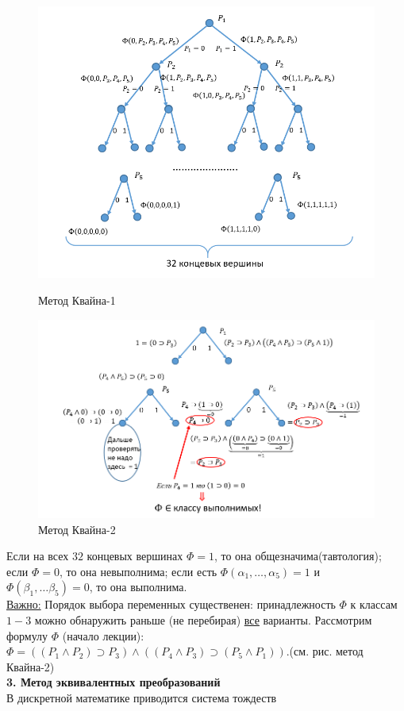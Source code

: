 \documentclass{article}
\numberwithin{example}{section}
\numberwithin{question}{section}
\numberwithin{Remark}{section}
\numberwithin{theorem}{section}
\numberwithin{definition}{section}
\numberwithin{proposition}{section}
\begin{document}
\begin{figure}[!htbp]
	\centering
	\includegraphics[width=0.9\linewidth]{4-2}
	\caption{Метод Квайна-1}
	\label{fig:4-2}
	\centering
	\includegraphics[width=0.9\linewidth]{4-3}
	\caption{Метод Квайна-2}
	\label{fig:4-3}
\end{figure}
Если на всех $32$ концевых вершинах $\Phi=1$, то она общезначима(тавтология); если $\Phi=0$, то она невыполнима; если есть $\Phi(\alpha_1,\ldots,\alpha_5)=1$ и $\Phi(\beta_1,\ldots\beta_5)=0$, то она выполнима.\\
\underline{Важно:} Порядок выбора переменных существенен: принадлежность $\Phi$ к классам $1-3$ можно обнаружить раньше (не перебирая) \underline{все} варианты. Рассмотрим формулу $\Phi$ (начало лекции): $\Phi=((P_1\wedge P_2)\supset P_3)\wedge((P_4\wedge P_3)\supset(P_5\wedge P_1))$.(см. рис. метод Квайна-2)\\
\textbf{3. Метод эквивалентных преобразований}\\
В дискретной математике приводится система тождеств
\end{document}
